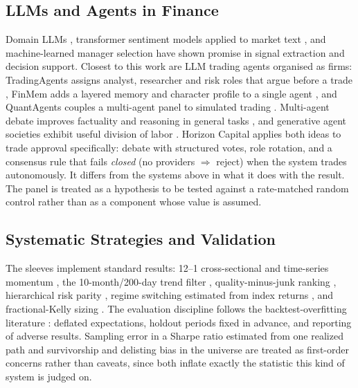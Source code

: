 \documentclass[10pt,twocolumn]{IEEEtran}
\begin{document}
\subsection{LLMs and Agents in Finance}
Domain LLMs \cite{wu2023bloomberggpt,yang2023fingpt}, transformer sentiment
models applied to market text \cite{palomo2023tweet}, and machine-learned
manager selection \cite{ma2025hedge} have shown promise in signal extraction
and decision support. Closest to this work are LLM trading agents organised
as firms: TradingAgents assigns analyst, researcher and risk roles that argue
before a trade \cite{xiao2024tradingagents}, FinMem adds a layered memory and
character profile to a single agent \cite{yu2023finmem}, and QuantAgents
couples a multi-agent panel to simulated trading \cite{li2025quantagents}.
Multi-agent debate improves factuality and reasoning in general tasks
\cite{du2023improving}, and generative agent societies exhibit useful
division of labor \cite{park2023generative}. Horizon Capital applies both
ideas to trade approval specifically: debate with structured votes, role
rotation, and a consensus rule that fails \emph{closed} (no providers
$\Rightarrow$ reject) when the system trades autonomously. It differs
from the systems above in what it does with the result. The panel is treated
as a hypothesis to be tested against a rate-matched random control rather
than as a component whose value is assumed.

\subsection{Systematic Strategies and Validation}
The sleeves implement standard results: 12--1 cross-sectional and time-series
momentum \cite{jegadeesh1993returns,moskowitz2012tsmom}, the
10-month/200-day trend filter \cite{faber2007tactical}, quality-minus-junk
ranking \cite{asness2019qmj}, hierarchical risk parity
\cite{lopezdeprado2016hrp}, regime switching estimated from index returns
\cite{hamilton1989regime,kritzman2012regime}, and fractional-Kelly sizing
\cite{kelly1956,maclean2011kelly}. The evaluation discipline follows the
backtest-overfitting literature \cite{bailey2014deflated,
lopezdeprado2018advances,harvey2016cross}: deflated expectations, holdout
periods fixed in advance, and reporting of adverse results. Sampling error in
a Sharpe ratio estimated from one realized path \cite{lo2002statistics} and
survivorship and delisting bias in the universe
\cite{elton1996survivorship,shumway1997delisting} are treated as first-order
concerns rather than caveats, since both inflate exactly the statistic this
kind of system is judged on.
\end{document}
